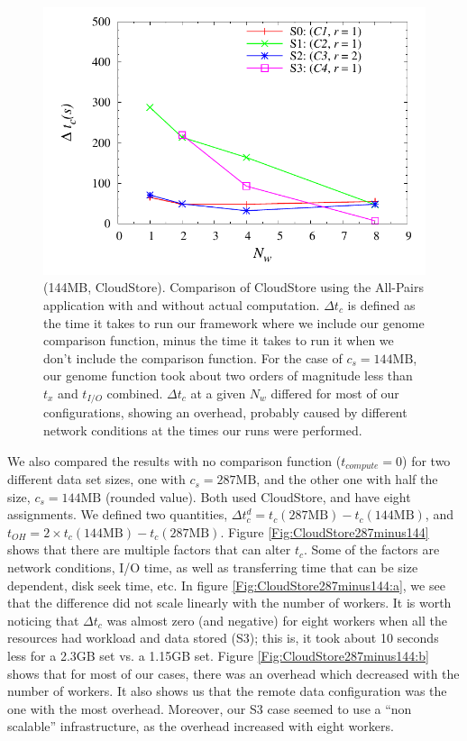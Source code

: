 \documentclass{rspublic}
\begin{document}
\begin{figure}
\begin{center}
\includegraphics[scale=0.5]{data/graphs/CloudStoreComputeMinusNoCompute144}
\caption{(144MB, CloudStore). Comparison of CloudStore using the All-Pairs application with
and without actual computation. $\Delta t_c$ is defined as the time it
takes to run our framework where we include our genome comparison
function, minus the time it takes to run it when we don't include the
comparison function. For the case of $c_s=144\mbox{MB}$, our genome function
took about two orders of magnitude less than $t_x$ and $t_{I/O}$
combined. $\Delta t_c$ at a given $N_w$ differed for most of our
configurations, showing an overhead, probably caused by different
network conditions at the times our runs were performed.}
\label{Fig:experiment4}
\end{center}
\vspace{-0.5cm}
\end{figure}

We also compared the results with no comparison function
($t_{compute}=0$) for two different data set sizes, one with $c_s =
287\mbox{MB}$, and the other one with half the size, $c_s = 144\mbox{MB}$ (rounded
value). Both used CloudStore, and have eight assignments. We defined two
quantities, $\Delta t_c^d = t_c(287\mbox{MB}) - t_c(144\mbox{MB})$, and
$t_{OH} = 2 \times t_c(144\mbox{MB}) - t_c(287\mbox{MB})$. Figure
\ref{Fig:CloudStore287minus144} shows that there are multiple factors
that can alter $t_c$. Some of the factors are network conditions, I/O
time, as well as transferring time that can be size dependent, disk seek
time, etc. In figure \ref{Fig:CloudStore287minus144:a}, we see that the
difference did not scale linearly with the number of workers. It is
worth noticing that $\Delta t_c$ was almost zero (and negative) for
eight workers when all the resources had workload and data stored (S3);
this is, it took about 10 seconds less for a 2.3GB set vs. a 1.15GB
set. Figure \ref{Fig:CloudStore287minus144:b} shows that for most of our
cases, there was an overhead which decreased with the number of workers.
It also shows us that the remote data configuration was the one with the
most overhead. Moreover, our S3 case seemed to use a ``non scalable''
infrastructure, as the overhead increased with eight workers.
\end{document}
